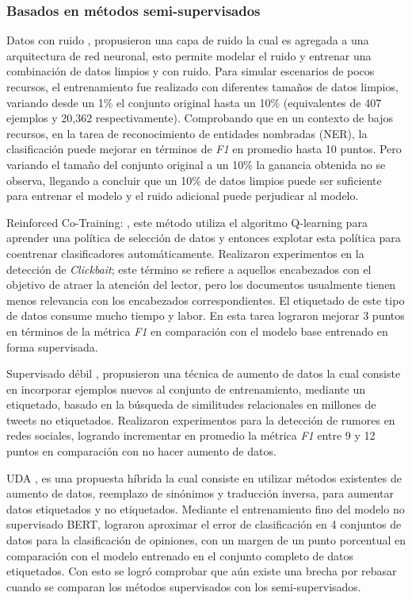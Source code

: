 \subsubsection{Basados en métodos semi-supervisados}

Datos con ruido \citep{hedderich2018training}, propusieron una capa de ruido la cual es agregada a una arquitectura de red neuronal, esto permite modelar el ruido y entrenar una combinación de datos limpios y con ruido. Para simular escenarios de pocos recursos, el entrenamiento fue realizado con diferentes tamaños de datos limpios, variando desde un 1\% el conjunto original hasta un 10\% (equivalentes de 407 ejemplos y 20,362 respectivamente). Comprobando que en un contexto de bajos recursos, en la tarea de reconocimiento de entidades nombradas (NER), la clasificación puede mejorar en términos de \textit{F1} en promedio hasta 10 puntos. Pero variando el tamaño del conjunto original a un 10\% la ganancia obtenida no se observa, llegando a concluir que un 10\% de datos limpios puede ser suficiente para entrenar el modelo y el ruido adicional puede perjudicar al modelo.

Reinforced Co-Training: \citep{wu2018reinforced}, este método utiliza el algoritmo Q-learning para aprender una política de selección de datos y entonces explotar esta política para coentrenar clasificadores automáticamente. Realizaron experimentos en la detección de \textit{Clickbait}; este término se refiere a aquellos encabezados con el objetivo de atraer la atención del lector, pero los documentos usualmente tienen menos relevancia con los encabezados correspondientes. El etiquetado de este tipo de datos consume mucho tiempo y labor. En esta tarea lograron mejorar 3 puntos en términos de la métrica \textit{F1} en comparación con el modelo base entrenado en forma supervisada.

Supervisado débil \citep{han2019neural}, propusieron una técnica de aumento de datos la cual consiste en incorporar ejemplos nuevos al conjunto de entrenamiento, mediante un etiquetado, basado en la búsqueda de similitudes relacionales en millones de tweets no etiquetados. Realizaron experimentos para la detección de rumores en redes sociales, logrando incrementar en promedio la métrica \textit{F1} entre 9 y 12 puntos en comparación con no hacer aumento de datos.

UDA \citep{xie2019unsupervised}, es una propuesta híbrida la cual consiste en utilizar métodos existentes de aumento de datos, reemplazo de sinónimos y traducción inversa, para aumentar datos etiquetados y no etiquetados. Mediante el entrenamiento fino del modelo no supervisado BERT, lograron aproximar el error de clasificación en 4 conjuntos de datos para la clasificación de opiniones, con un margen de un punto porcentual en comparación con el modelo entrenado en el conjunto completo de datos etiquetados. Con esto se logró comprobar que aún existe una brecha por rebasar cuando se comparan los métodos supervisados con los semi-supervisados.

